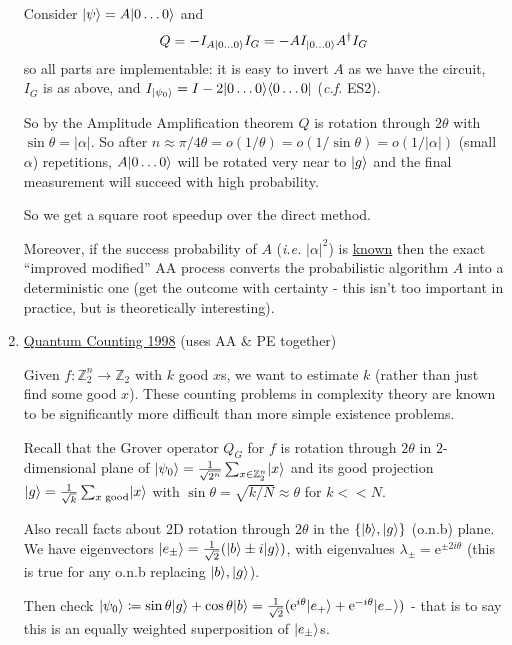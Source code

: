 \documentclass[]{article}
\DeclarePairedDelimiter\bra{\langle}{\rvert}
\DeclarePairedDelimiter\ket{\lvert}{\rangle}
\theoremstyle{custhm}
\theoremstyle{cusdef}
\theoremstyle{custhm}
\theoremstyle{custhm}
\theoremstyle{custhm}
\theoremstyle{custhm}
\theoremstyle{cusdef}
\theoremstyle{remark}
\newcommand{\Z}{\mathbb{Z}}
\newcommand{\e}{\mathrm{e}}
\newcommand{\ra}{\rightarrow}
\begin{document}
\begin{enumerate}
	Consider $\ket{\psi} = A\ket{0\dots0}$ and
	\begin{align*}
		Q = -I_{A\ket{0\dots0}}I_G = - AI_{\ket{0\dots0}}A^\dagger I_G
	\end{align*}
	so all parts are implementable: it is easy to invert $A$ as we have the circuit, $I_G$ is as above, and $I_{\ket{\psi_0}} = I - 2\ket{0\dots0}\bra{0\dots0}$ (\textit{c.f.} ES2).

	So by the Amplitude Amplification theorem $Q$ is rotation through $2\theta$ with $\sin\theta = |\alpha|$. So after $n\approx \pi/4\theta = o(1/\theta) = o(1/\sin\theta) = o(1/|\alpha|)$ (small $\alpha$) repetitions, $A\ket{0\dots0}$ will be rotated very near to $\ket{g}$ and the final measurement will succeed with high probability.

	So we get a square root speedup over the direct method.

	Moreover, if the success probability of $A$ (\textit{i.e.} $|\alpha|^2$) is \underline{known} then the exact ``improved modified'' AA process converts the probabilistic algorithm $A$ into a deterministic one (get the outcome with certainty - this isn't too important in practice, but is theoretically interesting).

	\item \underline{Quantum Counting 1998} (uses AA \& PE together)

	Given $f:\Z_2^n\ra\Z_2$ with $k$ good $x$s, we want to estimate $k$ (rather than just find some good $x$). These counting problems in complexity theory are known to be significantly more difficult than more simple existence problems.

	Recall that the Grover operator $Q_G$ for $f$ is rotation through $2\theta$ in $2$-dimensional plane of $\ket{\psi_0} = \frac{1}{\sqrt{2^n}}\sum_{x\in\Z_2^n}\ket{x}$ and its good projection $\ket{g} = \frac{1}{\sqrt{k}}\sum_{x\textrm{ good}}\ket{x}$ with $\sin\theta = \sqrt{k/N}\approx \theta$ for $k <<N$.

	Also recall facts about 2D rotation through $2\theta$ in the $\{\ket{b},\ket{g}\}$ (o.n.b) plane. We have eigenvectors $\ket{e_{\pm}} = \frac{1}{\sqrt{2}}(\ket{b}\pm i\ket{g})$, with eigenvalues $\lambda_{\pm} = \e^{\pm2i\theta}$ (this is true for any o.n.b replacing $\ket{b},\ket{g}$).

	Then check $\ket{\psi_0} \coloneqq \sin\theta\ket{g} + \cos\theta\ket{b} = \frac{1}{\sqrt{2}}(\e^{i\theta}\ket{e_+}+\e^{-i\theta}\ket{e_-})$ - that is to say this is an equally weighted superposition of $\ket{e_{\pm}}$s.


\end{enumerate}
\end{document}
